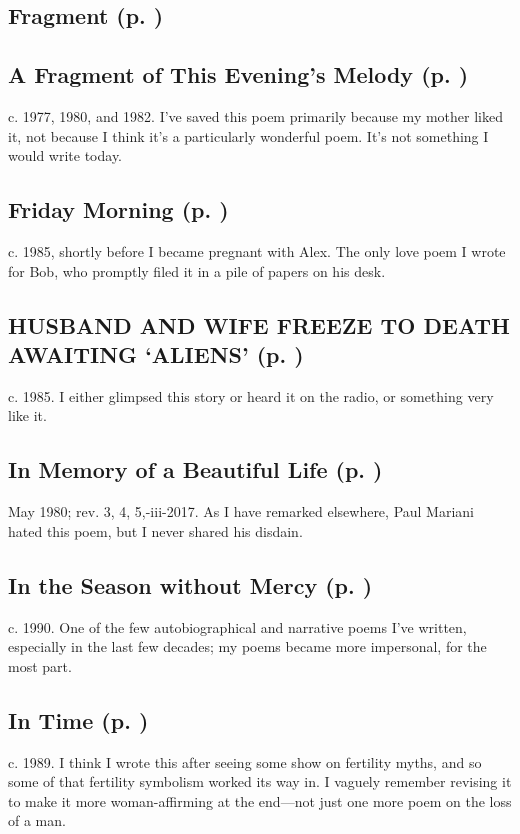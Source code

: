 \subsection*{Fragment (p. \pageref{ch:fragment})}

\subsection*{A Fragment of This Evening's Melody (p. \pageref{ch:a_fragment})}
c. 1977, 1980, and 1982. I've saved this poem primarily
because my mother liked it, not because I think it's a particularly
wonderful poem. It's not something I would write
today.

\subsection*{Friday Morning (p. \pageref{ch:friday_morning})}
c. 1985, shortly before I became pregnant with
Alex. The only love poem I wrote for Bob, who promptly
filed it in a pile of papers on his desk.

\subsection*{HUSBAND AND WIFE FREEZE TO DEATH AWAITING `ALIENS' (p. \pageref{ch:husband_and_wife_freeze})}
c. 1985. I either glimpsed this story or heard it on the
radio, or something very like it.

\subsection*{In Memory of a Beautiful Life (p. \pageref{ch:in_memory_of_a_beautiful})}
May 1980; rev. 3, 4, 5,-iii-2017. As I have remarked
elsewhere, Paul Mariani hated this poem, but I never shared his disdain.

\subsection*{In the Season without Mercy (p. \pageref{ch:in_the_season_without_mercy})}
c. 1990. One of the few autobiographical and narrative
poems I've written, especially in the last few decades; my poems became
more impersonal, for the most part.

\subsection*{In Time (p. \pageref{ch:in_time})}
c. 1989. I think I wrote this after seeing some show on
fertility myths, and so some of that fertility symbolism worked its way
in. I vaguely remember revising it to make it more woman-affirming at
the end---not just one more poem on the loss of a man.

